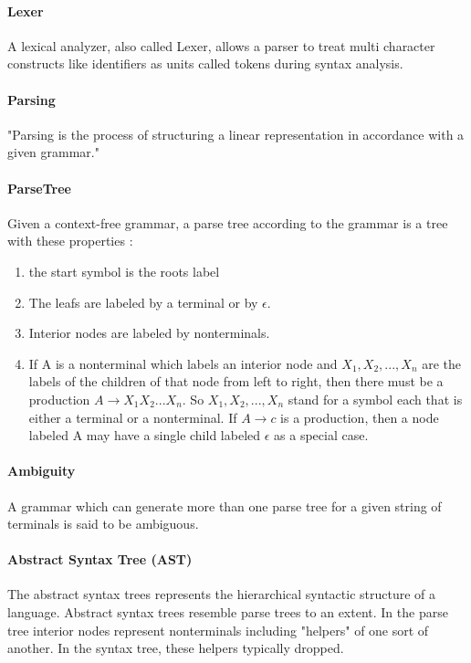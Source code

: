 \paragraph{Lexer}
A lexical analyzer, also called Lexer, allows a parser to treat multi character constructs like identifiers as units called tokens during syntax analysis. \cite{DragonBook}

\paragraph{Parsing} 
"Parsing is the process of structuring a linear representation in accordance with a given grammar." \cite{ParserBook}

\paragraph{ParseTree}
Given a context-free grammar, a parse tree according to the grammar is a tree with these properties \cite{DragonBook}:
\begin{enumerate}
	\item the start symbol is the roots label
	\item The leafs are labeled by a terminal or by $\epsilon$.
	\item Interior nodes are labeled by nonterminals.
	\item If A is a nonterminal which labels an interior node and $X_1, X_2, . . . , X_n$ are the labels of the children of that node from left to right, then there must be a production $A  \rightarrow X_1X_2 ... X_n$. So $X_1, X_2, ... , X_n$ stand for a symbol each that is either a terminal or a nonterminal. If $A\rightarrow c$ is a production, then a node labeled A may have a single child labeled $\epsilon$ as a special case. 
\end{enumerate}
 
\paragraph{Ambiguity} 
A grammar which can generate more than one parse tree for a given string of terminals is said to be ambiguous.\cite{DragonBook}

\paragraph{Abstract Syntax Tree (AST)}  
The abstract syntax trees  represents the hierarchical syntactic structure of a language.  Abstract syntax trees resemble parse trees to an extent. In the parse tree interior nodes represent nonterminals including "helpers" of one sort of another. In the syntax tree, these helpers typically dropped. \cite{DragonBook}

